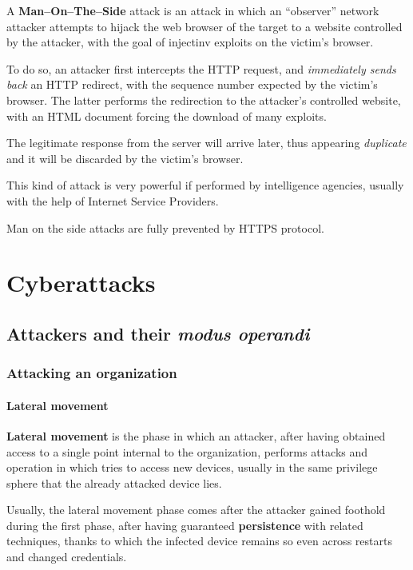 \documentclass[10pt]{extbook}
\begin{document}
A \textbf{Man--On--The--Side} attack is an attack in which an ``observer''
network attacker attempts to hijack the web browser of the target to a website
controlled by the attacker, with the goal of injectinv exploits on the victim's
browser.

To do so, an attacker first intercepts the HTTP request, and \emph{immediately
sends back} an HTTP redirect, with the sequence number expected by the victim's
browser. The latter performs the redirection to the attacker's controlled
website, with an HTML document forcing the download of many exploits.

The legitimate response from the server will arrive later, thus appearing
\emph{duplicate} and it will be discarded by the victim's browser.

This kind of attack is very powerful if performed by intelligence agencies,
usually with the help of Internet Service Providers.

Man on the side attacks are fully prevented by HTTPS protocol.

\part{Cyberattacks}

\chapter{Attackers and their \emph{modus operandi}}

\section{Attacking an organization}

\subsection{Lateral movement}

\textbf{Lateral movement} is the phase in which an attacker, after having
obtained access to a single point internal to the organization, performs
attacks and operation in which tries to access new devices, usually in the same
privilege sphere that the already attacked device lies. 

Usually, the lateral
movement phase comes after the attacker gained foothold during the first phase,
after having guaranteed \textbf{persistence} with related techniques, thanks to
which the infected device remains so even across restarts and changed
credentials. 
\end{document}
